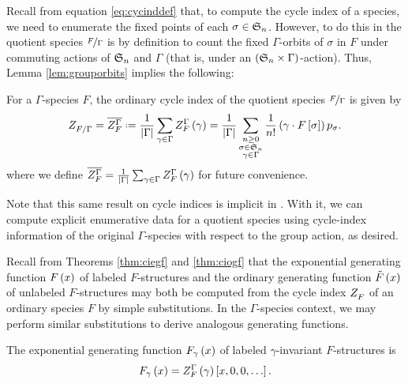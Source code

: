 \documentclass[sectionflow,singlespace,twoside,boldmathhdr,draft]{brandiss} %
\numberwithin{section}{chapter}
\numberwithin{figure}{chapter}
\begin{document}
Recall from equation \eqref{eq:cycinddef} that, to compute the cycle index of a species, we need to enumerate the fixed points of each $\sigma \in  \mathfrak{S}_{n} $.
However, to do this in the quotient species $\nicefrac{F}{\Gamma}$ is by definition to count the fixed $\Gamma$-orbits of $\sigma$ in $F$ under commuting actions of $ \mathfrak{S}_{n} $ and $\Gamma$ (that is, under an $\left( { \mathfrak{S}_{n}  \times \Gamma} \right)$-action).
Thus, Lemma \ref{lem:grouporbits} implies the following:
\begin{theorem}\label{thm:qsci}
  For a $\Gamma$-species $F$, the ordinary cycle index of the quotient species $\nicefrac{F}{\Gamma}$ is given by 
  \begin{equation}
    \label{eq:quotcycind}
    \ci{F / \Gamma} = \qgci{\Gamma}{F} \defeq \frac{1}{\abs{\Gamma}} \sum_{\gamma \in \Gamma} \gci{\Gamma}{F} \pbrac{\gamma} = \frac{1}{\abs{\Gamma}} \sum_{\substack{n \geq 0 \\ \sigma \in \symgp{n} \\ \gamma \in \Gamma}} \frac{1}{n!} \pbrac{\gamma \cdot F \sbrac{\sigma}} p_{\sigma}.
  \end{equation}
  where we define $ \overline{  Z_{F}^{{\Gamma} {}}  }  = \frac{1}{\left\vert {\Gamma} \right\vert} \sum_{\gamma \in \Gamma}  Z_{F}^{{\Gamma} {}}  \left( {\gamma} \right)$ for future convenience.
\end{theorem}
Note that this same result on cycle indices is implicit in \cite[\S 2.2.3]{bous:species}.
With it, we can compute explicit enumerative data for a quotient species using cycle-index information of the original $\Gamma$-species with respect to the group action, as desired.

Recall from Theorems \ref{thm:ciegf} and \ref{thm:ciogf} that the exponential generating function $F \left( {x} \right)$ of labeled $F$-structures and the ordinary generating function $\tilde{F} \left( {x} \right)$ of unlabeled $F$-structures may both be computed from the cycle index $ Z_{F}^{} $ of an ordinary species $F$ by simple substitutions.
In the $\Gamma$-species context, we may perform similar substitutions to derive analogous generating functions.

\begin{theorem}
  \label{thm:gciegf}
  The exponential generating function $F_{\gamma} \left( {x} \right)$ of labeled $\gamma$-invariant $F$-structures is
  \begin{equation}
    \label{eq:gciegf}
    F_{\gamma} \left( {x} \right) =  Z_{F}^{{\Gamma} {}}  \left( {\gamma} \right) \left[ {x, 0, 0, \dots} \right].
  \end{equation}
\end{theorem}
\end{document}

